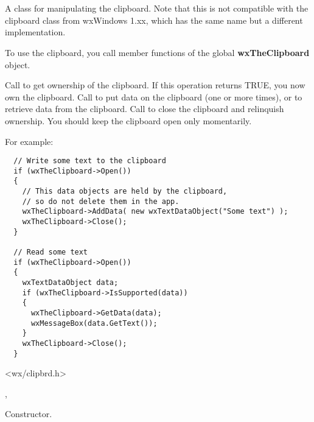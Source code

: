 \section{}\label{wxclipboard}

A class for manipulating the clipboard. Note that this is not compatible with the
clipboard class from wxWindows 1.xx, which has the same name but a different implementation.

To use the clipboard, you call member functions of the global {\bf wxTheClipboard} object.

Call  to get ownership of the clipboard. If this operation returns TRUE, you
now own the clipboard. Call  to put data
on the clipboard (one or more times), or  to
retrieve data from the clipboard. Call  to close
the clipboard and relinquish ownership. You should keep the clipboard open only momentarily.

For example:

\begin{verbatim}
  // Write some text to the clipboard
  if (wxTheClipboard->Open())
  {
    // This data objects are held by the clipboard, 
    // so do not delete them in the app.
    wxTheClipboard->AddData( new wxTextDataObject("Some text") );
    wxTheClipboard->Close();
  }

  // Read some text
  if (wxTheClipboard->Open())
  {
    wxTextDataObject data;
    if (wxTheClipboard->IsSupported(data))
    {
      wxTheClipboard->GetData(data);
      wxMessageBox(data.GetText());
    }  
    wxTheClipboard->Close();
  }
\end{verbatim}




<wx/clipbrd.h>


, 




Constructor.

